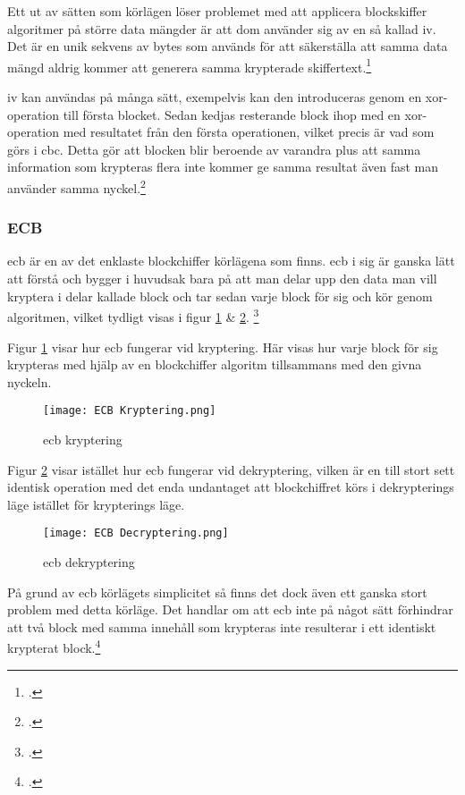 Ett ut av sätten som körlägen löser problemet med att applicera blockskiffer algoritmer på
större data mängder är att dom använder sig av en så kallad \acrfull{iv}. Det är en unik sekvens
av bytes som används för att säkerställa att samma data mängd aldrig kommer att generera samma
krypterade skiffertext.\footcite{dworkin2001sp}

\acrshort{iv} kan användas på många sätt, exempelvis kan den introduceras genom en
\gls{xor}-operation till första blocket. Sedan kedjas resterande block ihop med en \gls{xor}-operation med resultatet från
den första operationen, vilket precis är vad som görs i \acrshort{cbc}. Detta gör att blocken blir beroende av varandra
plus att samma information som krypteras flera inte kommer ge samma resultat även fast man använder samma
nyckel.\footcite{dworkin2001sp}

\subsubsection{ECB}
\label{sec:ecb}
\acrfull{ecb} är en av det enklaste blockchiffer körlägena som finns.
\acrshort{ecb} i sig är ganska lätt att förstå och bygger i huvudsak bara på
att man delar upp den data man vill kryptera i delar kallade block och tar sedan varje
block för sig och kör genom algoritmen, vilket tydligt visas i
figur \ref{fig:ecb-mode-enc} \& \ref{fig:ecb-mode-dec}.
\footcite{dworkin2001sp}

Figur \ref{fig:ecb-mode-enc} visar hur \acrshort{ecb} fungerar vid kryptering.
Här visas hur varje block för sig krypteras med hjälp av en blockchiffer algoritm
tillsammans med den givna nyckeln.

\begin{figure}[H]
    \texttt{[image: ECB Kryptering.png]}
    \caption{\acrlong{ecb} kryptering}
    \label{fig:ecb-mode-enc}
\end{figure}

Figur \ref{fig:ecb-mode-dec} visar istället hur \acrshort{ecb} fungerar vid
dekryptering, vilken är en till stort sett identisk operation med det enda undantaget
att blockchiffret körs i dekrypterings läge istället för krypterings läge.

\begin{figure}[H]
    \texttt{[image: ECB Decryptering.png]}
    \caption{\acrlong{ecb} dekryptering}
    \label{fig:ecb-mode-dec}
\end{figure}

På grund av \acrshort{ecb} körlägets simplicitet så finns det dock även ett ganska
stort problem med detta körläge. Det handlar om att \acrshort{ecb} inte på något
sätt förhindrar att två block med samma innehåll som krypteras inte resulterar i
ett identiskt krypterat block.\footcite{dworkin2001sp}

